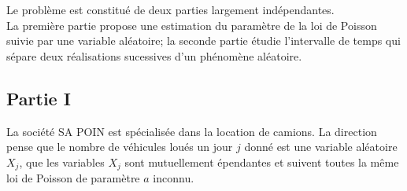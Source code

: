 \documentclass[11pt]{article}%
\begin{document}
Le problème est constitué de deux parties largement indépendantes.\\
La première partie propose une estimation du paramètre de la loi de
Poisson
suivie par une variable aléatoire; la seconde partie étudie
l'intervalle de
temps qui sépare deux réalisations sucessives d'un phénomène aléatoire.

\subsection*{\textbf{Partie I}}

La société SA POIN est spécialisée dans la location de camions. La
direction
pense que le nombre de véhicules loués un jour $j$ donné est une
variable aléatoire $X_{j}$, que les variables $X_{j}$ sont mutuellement
épendantes et
suivent toutes la même loi de Poisson de paramètre $a$ inconnu.
\end{document}
